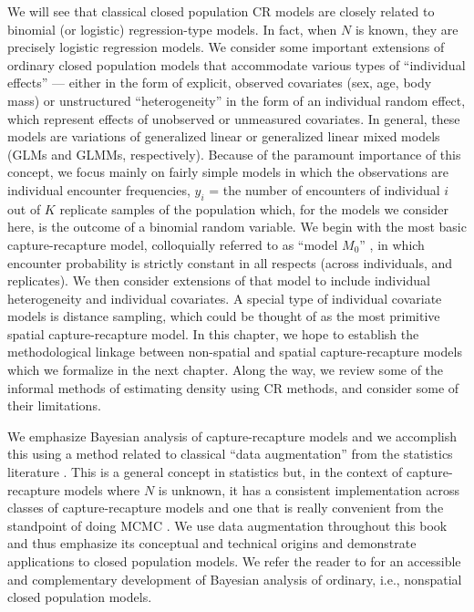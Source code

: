 We will see that classical closed population CR models are closely
related to binomial (or logistic) regression-type models. In fact,
when $N$ is known, they are precisely logistic regression models.  We
consider some important extensions of ordinary closed population
models that accommodate various types of ``individual effects'' ---
either in the form of explicit, observed covariates (sex, age, body
mass) or unstructured ``heterogeneity'' in the form of an individual
random effect, which represent effects of unobserved or unmeasured
covariates. In general, these models are variations of generalized
linear or generalized linear mixed models (GLMs and GLMMs,
respectively).  Because of the paramount importance of this concept,
we focus mainly on fairly simple models in which the observations are
individual encounter frequencies, $y_{i}$ = the number of encounters
of individual $i$ out of $K$ replicate samples of the population
which, for the models we consider here, is the outcome of a binomial
random variable.
We begin with the most basic
capture-recapture model, colloquially referred to as ``model $M_0$''
\citep{otis_etal:1978}, in which encounter probability is strictly
constant in all respects (across individuals, and replicates).
 We then
consider extensions of that model to include individual heterogeneity
and individual covariates. A special type of individual covariate
models is distance sampling, which could be thought of as the most
primitive spatial capture-recapture model. 
In this chapter, we hope 
to establish the methodological linkage between non-spatial
and spatial capture-recapture models which we formalize in the next chapter.
 Along the way, 
we review some of
the informal methods of estimating density using CR methods, and
consider some of their limitations.  


We emphasize Bayesian analysis of capture-recapture models and we
accomplish this using a method related to classical ``data
augmentation'' from the statistics literature
\citep[e.g.,][]{tanner_wong:1987}.  This is a general concept in
statistics but, in the context of capture-recapture models where $N$
is unknown, it has a consistent implementation across classes of
capture-recapture models and one that is really convenient from the
standpoint of doing MCMC \citep{royle_etal:2007,royle_dorazio:2012}. We use data
augmentation throughout this book and thus emphasize its conceptual
and technical origins and demonstrate applications to closed
population models.  We refer the reader to
\citet[][ch. 6]{kery_schaub:2011} for an accessible and complementary
development of Bayesian analysis of ordinary, i.e., nonspatial closed population models.


